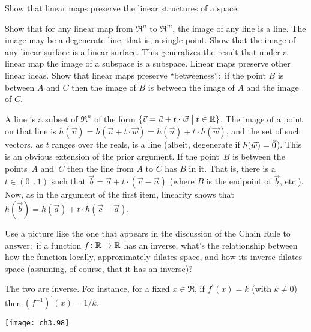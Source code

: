 \begin{exercises}
    Show that linear maps preserve the linear structures of a space.
    \begin{exparts}
      \partsitem Show that for any linear map from $\Re^n$ to $\Re^m$,
         the image of any line is a line.
         The image may be a degenerate line, that is, a single point.
      \partsitem Show that the image of any linear surface is a linear surface.
         This generalizes the result that under a linear map the image of
         a subspace is a subspace.
      \partsitem Linear maps preserve other linear ideas.
         Show that linear maps preserve ``betweeness'':~if the point
         $B$ is between $A$ and $C$ then the image of $B$ is between the
         image of $A$ and the image of $C$.
    \end{exparts}
    \begin{answer}
      \begin{exparts}
        \partsitem A line is a subset of $\Re^n$ of the form
          $\mbox{$\{\vec{v}=\vec{u}+t\cdot\vec{w}\bigm| t\in\mathbb{R}\}$}$.
          The image of a point on that line is 
          $h(\vec{v})=h(\vec{u}+t\cdot\vec{w})=h(\vec{u})+t\cdot h(\vec{w})$,
          and the set of such vectors, as $t$ ranges over the reals, is
          a line (albeit, degenerate if $h(\vec{w})=\vec{0}$).
        \partsitem This is an obvious extension of the prior argument.
        \partsitem If the point~$B$ is between the points~$A$ and~$C$ then the
          line from $A$ to $C$ has $B$ in it.
          That is, there is a $t\in (0\,..\,1)$ such that
          $\vec{b}=\vec{a}+t\cdot (\vec{c}-\vec{a})$ (where $B$ is the
          endpoint of $\vec{b}$, etc.).
          Now, as in the argument of the first item, linearity shows that
          $h(\vec{b})=h(\vec{a})+t\cdot h(\vec{c}-\vec{a})$.  
      \end{exparts}
    \end{answer}
  \item 
    Use a picture like the one 
    that appears in the discussion of the Chain Rule
    to answer:~if a function $\mbox{$f\colon \mathbb{R}\to \mathbb{R}$}$ has an inverse,
    what's the relationship between how the function \Dash locally, 
    approximately \Dash  dilates space, and
    how its inverse dilates space (assuming, of course, that it has an 
    inverse)?
    \begin{answer}
      The two are inverse.
      For instance, for a fixed $x\in\Re$,
      if $f^\prime (x)=k$ (with $k\neq 0$) then 
      $(f^{-1})^\prime (x)=1/k$.
      \begin{center}
        \texttt{[image: ch3.98]}
     \end{center}
    \end{answer}
\end{exercises}
\endinput


